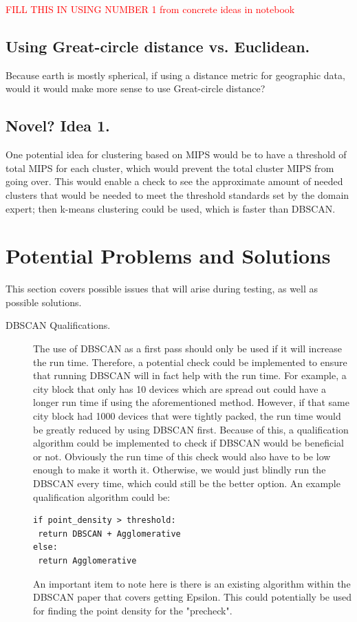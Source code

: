 \documentclass[letterpaper,twocolumn,10pt]{article}
\newcommand\todo[1]{\textcolor{red}{#1}}
\begin{document}
\todo{FILL THIS IN USING NUMBER 1 from concrete ideas in notebook}
 
\subsection{Using Great-circle distance vs. Euclidean.}Because earth is mostly spherical, if using a distance metric for geographic data, would it would make more sense to use Great-circle distance?

\subsection{Novel? Idea 1.} One potential idea for clustering based on MIPS would be to have a threshold of total MIPS for each cluster, which would prevent the total cluster MIPS from going over. This would enable a check to see the approximate amount of needed clusters that would be needed to meet the threshold standards set by the domain expert; then k-means clustering could be used, which is faster than DBSCAN.

\section{Potential Problems and Solutions}
This section covers possible issues that will arise during testing, as well as possible solutions.
\begin{description}
\item[DBSCAN Qualifications.] The use of DBSCAN as a first pass should only be used if it will increase the run time. Therefore, a potential check could be implemented to ensure that running DBSCAN will in fact help with the run time. For example, a city block that only has 10 devices which are spread out could have a longer run time if using the aforementioned method. However, if that same city block had 1000 devices that were tightly packed, the run time would be greatly reduced by using DBSCAN first. Because of this, a qualification algorithm could be implemented to check if DBSCAN would be beneficial or not. Obviously the run time of this check would also have to be low enough to make it worth it. Otherwise, we would just blindly run the DBSCAN every time, which could still be the better option. An example qualification algorithm could be:
\begin{verbatim}
if point_density > threshold:
 return DBSCAN + Agglomerative
else:
 return Agglomerative
\end{verbatim}
An important item to note here is there is an existing algorithm within the DBSCAN paper that covers getting Epsilon. This could potentially be used for finding the point density for the "precheck".
\end{description}
\end{document}

